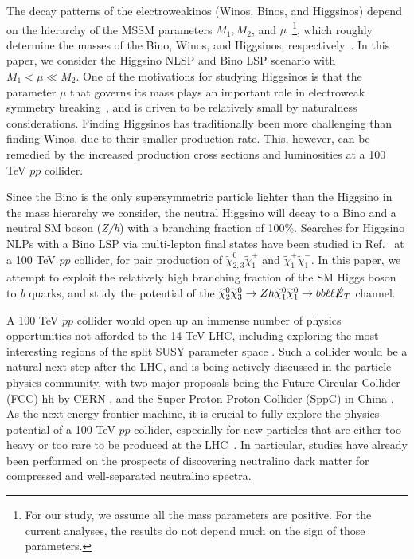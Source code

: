 \documentclass[a4paper,11pt]{article}
\newcommand{\N}{\widetilde{\chi}^0}
\newcommand{\C}{\widetilde{\chi}^\pm}
\newcommand{\met}{{\slashed{E}_T}}
\begin{document}
The decay patterns of the electroweakinos (Winos, Binos, and Higgsinos) depend
on the hierarchy of the MSSM parameters $M_1, M_2$, and $\mu$~\footnote{For our
study, we assume all the mass parameters are positive.  For the current
analyses, the results do not depend much on the sign of those parameters.},
which roughly determine the masses of the Bino, Winos, and Higgsinos,
respectively~\cite{Han:2013kza}.  In this paper, we consider the Higgsino NLSP
and Bino LSP scenario with $M_1 < \mu \ll M_2$.  One of the motivations for
studying Higgsinos is that the parameter $\mu$ that governs its mass plays an
important role in electroweak symmetry breaking~\cite{Acharya:2014pua}, and
is driven to be relatively small by naturalness considerations. 
Finding Higgsinos has traditionally been more challenging than finding Winos,
due to their smaller production rate.
This, however, can be remedied by the increased production cross sections and 
luminosities at a 100 TeV $pp$ collider.


 

Since the Bino is the only supersymmetric particle lighter than the Higgsino in
the mass hierarchy we consider, the neutral Higgsino will decay to a Bino and a
neutral SM boson (\emph{Z/h}) with a branching fraction of 100\%.  Searches for
Higgsino NLPs with a Bino LSP  via  multi-lepton final states have been studied
in Ref.~\cite{Gori:2014oua} at a 100 TeV $pp$ collider, for pair production of
$\N_{2,3}\C_1$ and
$\widetilde\chi_{1}^+\widetilde\chi_1^-$. In this paper, we attempt to exploit
the relatively high branching fraction of the SM Higgs boson to \emph{b} quarks,
and study the potential of the $\N_2\N_3\rightarrow Zh
\N_1\N_1\rightarrow bb\ell\ell \met$ channel.

A 100 TeV $pp$ collider would open up an immense number of physics
opportunities not afforded to the 14 TeV LHC, including exploring the most
interesting regions of the split SUSY parameter space
\cite{Arkani-Hamed:2015vfh}.
Such a collider would be a natural next step after the LHC, and is being
actively discussed in the particle physics community, with two major proposals
being the Future Circular Collider (FCC)-hh by CERN \cite{FCC-hh}, and the
Super Proton Proton Collider (SppC)  in China \cite{CEPC}.  As the next energy
frontier machine, it is crucial to fully explore the physics
potential of a 100 TeV $pp$ collider, especially for new particles that are
either too heavy or too rare to be produced at the
LHC~\cite{Arkani-Hamed:2015vfh,Contino:2016spe,Golling:2016gvc,Mangano:2016jyj}.
In particular, studies have already been performed on the prospects of
discovering neutralino dark matter for compressed \cite{Low:2014cba,
diCortona:2014yua,Cirelli:2014dsa,Mahbubani:2018tin,Han:2018wus} and
well-separated \cite{Gori:2014oua,Acharya:2014pua} neutralino spectra.
\end{document}
